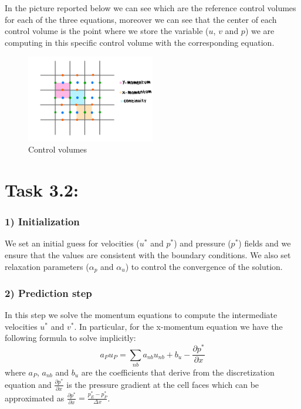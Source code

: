 \documentclass{article}
\begin{document}
In the picture reported below we can see which are the reference control volumes for each of the three equations, moreover we can see
that the center of each control volume is the point where we store the variable ($u$, $v$ and $p$) we are computing in this specific control volume with the corresponding equation.

\begin{figure}[h!]
  \centering
  \includegraphics[width=0.5\textwidth]{controlvolumes.jpg}
  \caption{Control volumes}
\end{figure}

\newpage
\section*{\Large Task 3.2:}
\subsubsection*{1) Initialization}
We set an initial guess for velocities ($u^*$ and $p^*$) and pressure ($p^*$) fields and we ensure that the values are consistent with the boundary conditions.
We also set relaxation parameters ($\alpha_p$ and $\alpha_u$) to control the convergence of the solution.

\subsubsection*{2) Prediction step}
In this step we solve the momentum equations to compute the intermediate velocities $u^*$ and $v^*$.
In particular, for the x-momentum equation we have the following formula to solve implicitly:
\begin{equation}
  a_{P}u_{P}=\sum_{nb}a_{nb}u_{nb}+b_{u}-\frac{\partial p^{*}}{\partial x}
\end{equation}
where $a_{P}$, $a_{nb}$ and $b_{u}$ are the coefficients that derive from the discretization equation and $\frac{\partial p^{*}}{\partial x}$ is the pressure gradient
at the cell faces which can be approximated as $\frac{\partial p^{*}}{\partial x}=\frac{p_{E}^{*}-p_{P}^{*}}{\Delta x}$.
\end{document}
